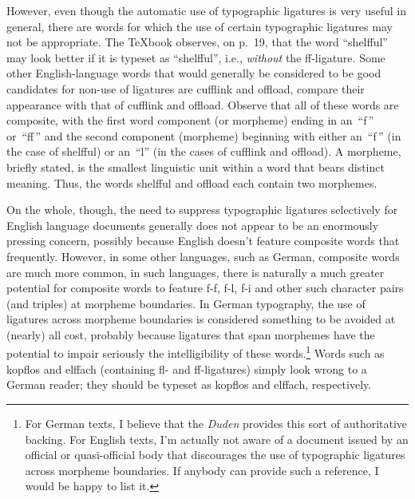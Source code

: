 \documentclass[12pt]{article}
\begin{document}
However, even though the automatic use of typographic ligatures is very useful in general, there are words for which the use of certain typographic ligatures may not be appropriate. The \TeX book observes, on p.~19, that the word \enquote{\mbox{shelfful}} may look better if it is typeset as \enquote{shelfful}, i.e., \emph{without} the ff-ligature. Some other English-language words that would generally be considered to be good candidates for non-use of ligatures are \mbox{cufflink} and \mbox{offload}, compare their appearance with that of cufflink and offload. Observe that all of these words are composite, with the first word component (or morpheme) ending in an~\enquote{f\,} or~\enquote{ff\,} and the second component (morpheme) beginning with either an~\enquote{f\,} (in the case of shelfful) or an~\enquote{l} (in the cases of cufflink and offload). A morpheme, briefly stated, is the smallest linguistic unit within a word that bears distinct meaning. Thus, the words shelfful and offload each contain two morphemes. 

On the whole, though, the need to suppress typographic ligatures selectively for English language documents  generally does not appear to be an enormously pressing concern, possibly because English doesn't feature composite words that frequently. However, in some other languages, such as German, composite words are much more common, in such languages, there is naturally a much greater potential for composite words to feature f-f, f-l, f-i and other such character pairs (and triples) at morpheme boundaries. In German typography, the use of ligatures across morpheme boundaries is considered something to be avoided at (nearly) all cost, probably because ligatures that span morphemes have the potential to impair seriously the intelligibility of these words.\footnote{For German texts, I believe that the \emph{Duden} provides this sort of authoritative backing. For English texts, I'm actually not aware of a document issued by an official or quasi-official body that discourages the use of typographic ligatures across morpheme boundaries. If anybody can provide such a reference, I would be happy to list it.} Words such as \mbox{kopflos} and \mbox{elffach} (containing fl- and ff-ligatures) simply look wrong to a German reader; they should be typeset as kopflos and elffach, respectively.
\end{document}
